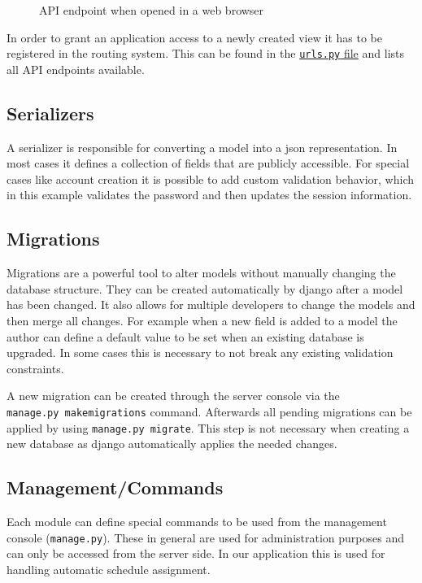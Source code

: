 \begin{figure}[htbp]
\centering
{}
\caption{API endpoint when opened in a web browser}
\end{figure}

In order to grant an application access to a newly created view it has
to be registered in the routing system. This can be found in the
\href{../../server/server/urls.py}{\texttt{urls.py} file} and lists all
API endpoints available.

\subsection{Serializers}\label{serializers}

A serializer is responsible for converting a model into a json
representation. In most cases it defines a collection of fields that are
publicly accessible. For special cases like account creation it is
possible to add custom validation behavior, which in this example
validates the password and then updates the session information.

\subsection{Migrations}\label{migrations}

Migrations are a powerful tool to alter models without manually changing
the database structure. They can be created automatically by django
after a model has been changed. It also allows for multiple developers
to change the models and then merge all changes. For example when a new
field is added to a model the author can define a default value to be
set when an existing database is upgraded. In some cases this is
necessary to not break any existing validation constraints.

A new migration can be created through the server console via the
\texttt{manage.py\ makemigrations} command. Afterwards all pending
migrations can be applied by using \texttt{manage.py\ migrate}. This
step is not necessary when creating a new database as django
automatically applies the needed changes.

\subsection{Management/Commands}\label{managementcommands}

Each module can define special commands to be used from the management
console (\texttt{manage.py}). These in general are used for
administration purposes and can only be accessed from the server side.
In our application this is used for handling automatic schedule
assignment.

